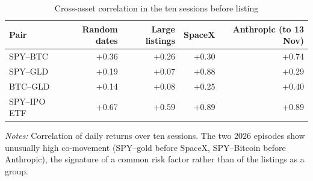 \begin{table}[!htbp]\centering\footnotesize
\caption{Cross-asset correlation in the ten sessions before listing}\label{tab:correp}

\begin{threeparttable}
\begin{tabular}{lrrrr}
\toprule
Pair & Random dates & Large listings & SpaceX & Anthropic (to 13 Nov) \\
\midrule
SPY--BTC & +0.36 & +0.26 & +0.30 & +0.74 \\
SPY--GLD & +0.19 & +0.07 & +0.88 & +0.29 \\
BTC--GLD & +0.14 & +0.08 & +0.25 & +0.40 \\
SPY--IPO ETF & +0.67 & +0.59 & +0.89 & +0.89 \\
\bottomrule
\end{tabular}
\begin{tablenotes}[flushleft]\footnotesize
\item \textit{Notes:} Correlation of daily returns over ten sessions. The two 2026 episodes show unusually high co-movement (SPY--gold before SpaceX, SPY--Bitcoin before Anthropic), the signature of a common risk factor rather than of the listings as a group.
\end{tablenotes}
\end{threeparttable}

\end{table}
